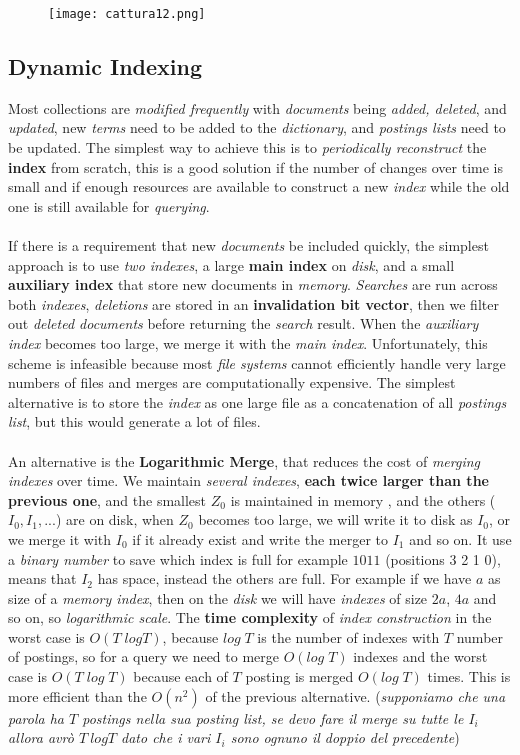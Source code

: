\documentclass{article}
\begin{document}
\begin{figure}[H]
  \centering
  \texttt{[image: cattura12.png]}
\end{figure}
\subsection{Dynamic Indexing}
Most collections are \emph{modified frequently} with \emph{documents} being \emph{added, deleted}, and \emph{updated}, new \emph{terms} need to be added to the \emph{dictionary}, and \emph{postings lists} need to be updated. The simplest way to achieve this is to \emph{periodically reconstruct} the \textbf{index} from scratch, this is a good solution if the number of changes over time is small and if enough resources are available to construct a new \emph{index} while the old one is still available for \emph{querying}.\\\\ If there is a requirement that new \emph{documents} be included quickly, the simplest approach is to use \emph{two indexes}, a large \textbf{main index} on \emph{disk}, and a small \textbf{auxiliary index} that store new documents in \emph{memory}. \emph{Searches} are run across both \emph{indexes}, \emph{deletions} are stored in an \textbf{invalidation bit vector}, then we filter out \emph{deleted documents} before returning the \emph{search} result. When the \emph{auxiliary index} becomes too large, we merge it with the \emph{main index}. Unfortunately, this scheme is infeasible because most \emph{file systems} cannot efficiently handle very large numbers of files and merges are computationally expensive. The simplest alternative is to store the \emph{index} as one large file as a concatenation of all \emph{postings list}, but this would generate a lot of files. \\\\
An alternative is the \textbf{Logarithmic Merge}, that reduces the cost of \emph{merging indexes} over time. We maintain \emph{several indexes}, \textbf{each twice larger than the previous one}, and the smallest $Z_0$ is maintained in memory , and the others ($I_0, I_1, ...$) are on disk, when $Z_0$ becomes too large, we will write it to disk as $I_0$, or we merge it with $I_0$ if it already exist and write the merger to $I_1$ and so on. It use a \emph{binary number} to save which index is full for example $1011$ (positions 3 2 1 0), means that $I_2$ has space, instead the others are full. For example if we have $a$ as size of a \emph{memory index}, then on the \emph{disk} we will have \emph{indexes} of size $2a$, $4a$ and so on, so \emph{logarithmic scale}. The \textbf{time complexity} of \emph{index construction} in the worst case is $O(T\; log T)$, because $log\; T$ is the number of indexes with $T$ number of postings, so for a query we need to merge $O(log\; T)$ indexes and the worst case is $O(T\; log\; T)$ because each of $T$ posting is merged $O(log\; T)$ times. This is more efficient than the $O(n^2)$ of the previous alternative. (\emph{supponiamo che una parola ha $T$ postings nella sua posting list, se devo fare il merge su tutte le $I_i$ allora avrò $T\: log T$ dato che i vari $I_i$ sono ognuno il doppio del precedente})
\end{document}
